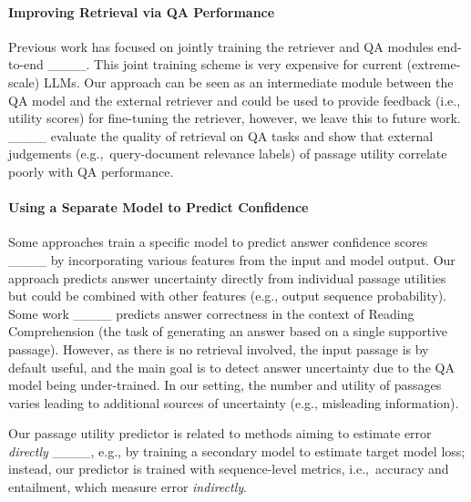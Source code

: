 \paragraph{Improving Retrieval via QA Performance}

Previous work has focused on jointly training the retriever and QA
modules end-to-end
____.  This
joint training scheme is very expensive for current (extreme-scale)
LLMs. Our approach can be seen as an intermediate module between the
QA model and the external retriever and could be used to provide
feedback (i.e., utility scores) for fine-tuning the retriever,
however, we leave this to future
work. ____ evaluate the quality of
retrieval on QA tasks and show that external judgements
(e.g.,~query-document relevance labels) of passage utility correlate
poorly with QA performance.


\paragraph{Using a Separate Model to Predict Confidence} Some
approaches train a specific model to predict answer confidence scores
____
by incorporating various features from the input and model output.
Our approach predicts answer uncertainty directly from individual
passage utilities but could be combined with other features (e.g.,
output sequence probability). Some work
____ predicts
answer correctness in the context of Reading Comprehension (the
task of generating an answer based on a single supportive
passage). However, as there is no retrieval involved, the input
passage is by default useful, and the main goal is to detect answer
uncertainty due to the QA model being under-trained. In our setting,
the number and utility of passages varies leading to additional sources of
uncertainty (e.g., misleading information).

Our passage utility predictor is related to methods aiming to estimate
error \emph{directly} ____, e.g., by training a
secondary model to estimate target model loss; instead, our predictor is trained
with sequence-level metrics, i.e.,~accuracy and entailment, which
measure error \emph{indirectly}.